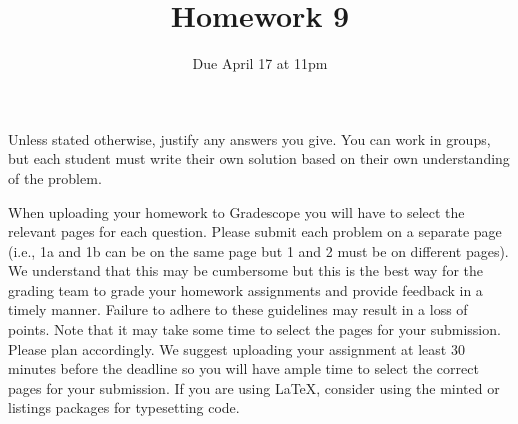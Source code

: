 \documentclass[12pt]{article}
\begin{document}
\title{\sc Homework 9}
\date{Due April 17 at 11pm} 
\author{}
\maketitle




\newtheorem*{problem}{Problem}
\newtheorem*{heuristic}{Heuristic}
\newtheorem*{conjecture}{Conjecture}
\newtheorem{theorem}{Theorem}[section]
\newtheorem{corollary}[theorem]{Corollary}
\newtheorem{prop}[theorem]{Proposition}
\newtheorem{lemma}[theorem]{Lemma}
\newtheorem{definition}[theorem]{Definition}
\theoremstyle{remark}
\newtheorem{example}[theorem]{Example}
\newtheorem{remark}[theorem]{Remark}
\newtheorem{exercise}[theorem]{Exercise}


Unless stated otherwise, justify any answers you give. You can work in groups, but each student
must write their own solution based on their own understanding of the problem.

When uploading your homework to Gradescope you will have to select the relevant pages
for each question. Please submit each problem on a separate page (i.e., 1a and 1b can be on
the same page but 1 and 2 must be on different pages). We understand that this may be
cumbersome but this is the best way for the grading team to grade your homework assignments and provide feedback in a timely manner. Failure to adhere to these guidelines may
result in a loss of points. Note that it may take some time to select the pages for your submission. Please plan accordingly. We suggest uploading your assignment at least 30 minutes
before the deadline so you will have ample time to select the correct pages for your submission. If you are using \LaTeX, consider using the minted or listings packages for typesetting code.

\medskip
\end{document}
